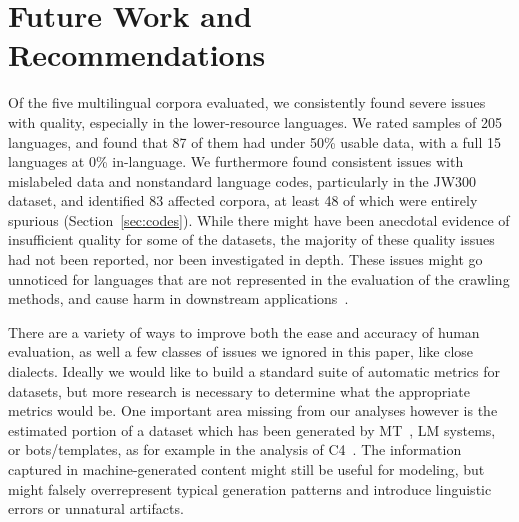 \section{Future Work and Recommendations}\label{sec:recommendation}
Of the five multilingual corpora evaluated, we consistently found severe issues with quality, especially in the lower-resource languages. We rated samples of 205 languages, and found that 87 of them had under 50\% usable data, with a full 15 languages at 0\% in-language. We furthermore found consistent issues with mislabeled data and nonstandard language codes, particularly in the JW300 dataset, and identified 83 affected corpora, at least 48 of which were entirely spurious (Section~\ref{sec:codes}). While there might have been anecdotal evidence of insufficient quality for some of the datasets, the majority of these quality issues had not been reported, nor been investigated in depth. These issues might go unnoticed for languages that are not represented in the evaluation of the crawling methods, and cause harm in downstream applications~\citep{khayrallah-koehn-2018-impact}.

There are a variety of ways to improve both the ease and accuracy of human evaluation, as well a few classes of issues we ignored in this paper, like close dialects.
Ideally we would like to build a standard suite of automatic metrics for datasets, but more research is necessary to determine what the appropriate metrics would be. One important area missing from our analyses however is the estimated portion of a dataset which has been generated by MT~\citep{rarrick-etal-2011-mt}, LM systems, or bots/templates, as for example in the analysis of C4~\citep{dodge-etal-2021-documenting}. %
The information captured in machine-generated content might still be useful for modeling, but might falsely overrepresent typical generation patterns and introduce linguistic errors or unnatural artifacts.


